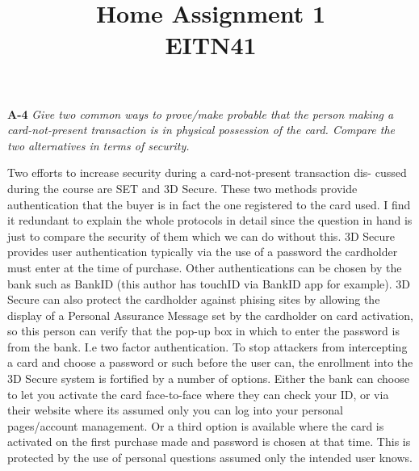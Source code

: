 \documentclass[a4paper]{article}
\title{Home Assignment 1 \\ EITN41}
\author{}
\date{}
\newcommand{\Q}[2]{
  \textbf{#1} \textit{#2}
 }
\newcommand{\A}[1]{ #1 }
\begin{document}
\maketitle

\Q{A-4} {
  Give two common ways to prove/make probable that the person making
  a card-not-present transaction is in physical possession of the card. Compare
  the two alternatives in terms of security.
}

\A{
  Two efforts to increase security during a card-not-present transaction dis-
  cussed during the course are SET and 3D Secure. These two methods provide
  authentication that the buyer is in fact the one registered to the card used.
  I find it redundant to explain the whole protocols in detail since the question
  in hand is just to compare the security of them which we can do without this.
  3D Secure provides user authentication typically via the use of a password
  the cardholder must enter at the time of purchase. Other authentications can be
  chosen by the bank such as BankID (this author has touchID via BankID app
  for example). 3D Secure can also protect the cardholder against phising sites
  by allowing the display of a Personal Assurance Message set by the cardholder
  on card activation, so this person can verify that the pop-up box in which to
  enter the password is from the bank. I.e two factor authentication. To stop
  attackers from intercepting a card and choose a password or such before the
  user can, the enrollment into the 3D Secure system is fortified by a number of
  options. Either the bank can choose to let you activate the card face-to-face
  where they can check your ID, or via their website where its assumed only you
  can log into your personal pages/account management. Or a third option is
  available where the card is activated on the first purchase made and password is
  chosen at that time. This is protected by the use of personal questions assumed
  only the intended user knows.

}
\end{document}
